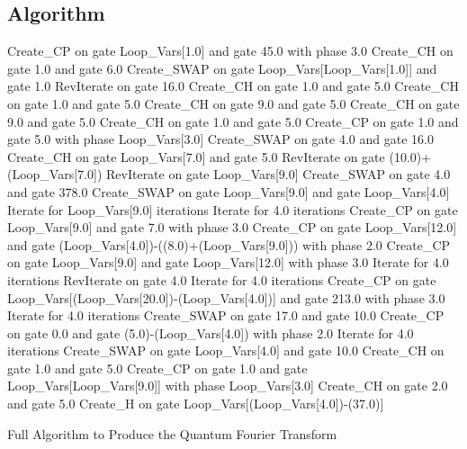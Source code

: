 \subsection{Algorithm}
\label{sec:evoqftalgo}
\begin{algorithm}
 \begin{algorithmic}
\STATE Create\_CP on gate Loop\_Vars[1.0] and gate 45.0 with phase 3.0
\STATE Create\_CH on gate 1.0 and gate 6.0
\STATE Create\_SWAP on gate Loop\_Vars[Loop\_Vars[1.0]] and gate 1.0
\STATE RevIterate on gate 16.0
\STATE Create\_CH on gate 1.0 and gate 5.0
\STATE Create\_CH on gate 1.0 and gate 5.0
\STATE Create\_CH on gate 9.0 and gate 5.0
\STATE Create\_CH on gate 9.0 and gate 5.0
\STATE Create\_CH on gate 1.0 and gate 5.0
\STATE Create\_CP on gate 1.0 and gate 5.0 with phase Loop\_Vars[3.0]
\STATE Create\_SWAP on gate 4.0 and gate 16.0
\STATE Create\_CH on gate Loop\_Vars[7.0] and gate 5.0
\STATE RevIterate on gate (10.0)+(Loop\_Vars[7.0])
\STATE RevIterate on gate Loop\_Vars[9.0]
\STATE Create\_SWAP on gate 4.0 and gate 378.0
\STATE Create\_SWAP on gate Loop\_Vars[9.0] and gate Loop\_Vars[4.0]
\STATE Iterate for Loop\_Vars[9.0] iterations {
\STATE Iterate for 4.0 iterations {
\STATE }
\STATE Create\_CP on gate Loop\_Vars[9.0] and gate 7.0 with phase 3.0
\STATE Create\_CP on gate Loop\_Vars[12.0] and gate (Loop\_Vars[4.0])-((8.0)+(Loop\_Vars[9.0])) with phase 2.0
\STATE Create\_CP on gate Loop\_Vars[9.0] and gate Loop\_Vars[12.0] with phase 3.0
\STATE Iterate for 4.0 iterations {
\STATE }
\STATE RevIterate on gate 4.0
\STATE Iterate for 4.0 iterations {
\STATE }
\STATE Create\_CP on gate Loop\_Vars[(Loop\_Vars[20.0])-(Loop\_Vars[4.0])] and gate 213.0 with phase 3.0
\STATE Iterate for 4.0 iterations {
\STATE }
\STATE {
\STATE }
\STATE Create\_SWAP on gate 17.0 and gate 10.0
\STATE Create\_CP on gate 0.0 and gate (5.0)-(Loop\_Vars[4.0]) with phase 2.0
\STATE Iterate for 4.0 iterations {
\STATE }
\STATE {
\STATE }
\STATE Create\_SWAP on gate Loop\_Vars[4.0] and gate 10.0
\STATE Create\_CH on gate 1.0 and gate 5.0
\STATE Create\_CP on gate 1.0 and gate Loop\_Vars[Loop\_Vars[9.0]] with phase Loop\_Vars[3.0]
\STATE Create\_CH on gate 2.0 and gate 5.0
\STATE Create\_H on gate Loop\_Vars[(Loop\_Vars[4.0])-(37.0)]
\STATE }
 \end{algorithmic}
\caption{Full Algorithm to Produce the Quantum Fourier Transform}
\label{alg:qftfullalg}
\end{algorithm}


